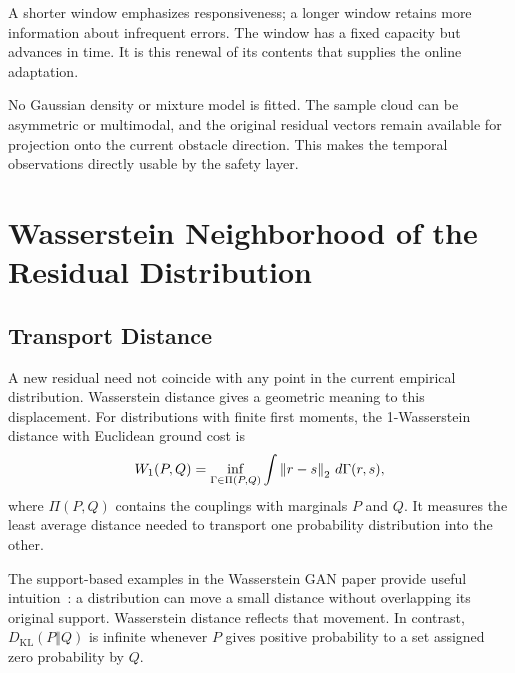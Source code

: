 A shorter window emphasizes responsiveness; a longer window retains more information about infrequent errors. The window has a fixed capacity but advances in time. It is this renewal of its contents that supplies the online adaptation.

No Gaussian density or mixture model is fitted. The sample cloud can be asymmetric or multimodal, and the original residual vectors remain available for projection onto the current obstacle direction. This makes the temporal observations directly usable by the safety layer.

\section{Wasserstein Neighborhood of the Residual Distribution}

\subsection{Transport Distance}

A new residual need not coincide with any point in the current empirical distribution. Wasserstein distance gives a geometric meaning to this displacement. For distributions with finite first moments, the 1-Wasserstein distance with Euclidean ground cost is
\begin{equation}
 W_1(P,Q)=\inf_{\Gamma\in\Pi(P,Q)}
       \int\left\lVert r-s\right\rVert_2\,d\Gamma(r,s),
 \label{eq:contribution_wasserstein}
\end{equation}
where $\Pi(P,Q)$ contains the couplings with marginals $P$ and $Q$. It measures the least average distance needed to transport one probability distribution into the other.

The support-based examples in the Wasserstein GAN paper provide useful intuition~\cite{thArjovsky2017}: a distribution can move a small distance without overlapping its original support. Wasserstein distance reflects that movement. In contrast, $D_{\mathrm{KL}}(P\Vert Q)$ is infinite whenever $P$ gives positive probability to a set assigned zero probability by $Q$.


